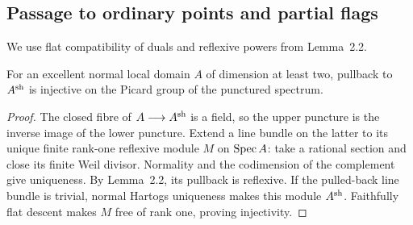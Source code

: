 \subsection{Passage to ordinary points and partial flags}
We use flat compatibility of duals and reflexive powers from Lemma~2.2.

\begin{lemma}\label{tor:strict-injection}
For an excellent normal local domain $A$ of dimension at least two, pullback to $A^{\mathrm{sh}}$ is injective on the Picard group of the punctured spectrum.
\end{lemma}
\begin{proof}
The closed fibre of $A\longrightarrow A^{\mathrm{sh}}$ is a field, so the upper puncture is the inverse image of the lower puncture. Extend a line bundle on the latter to its unique finite rank-one reflexive module $M$ on $\operatorname{Spec} A$: take a rational section and close its finite Weil divisor. Normality and the codimension of the complement give uniqueness. By Lemma~2.2, its pullback is reflexive. If the pulled-back line bundle is trivial, normal Hartogs uniqueness makes this module $A^{\mathrm{sh}}$. Faithfully flat descent makes $M$ free of rank one, proving injectivity.
\end{proof}

